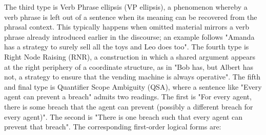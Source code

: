 The third type is Verb Phrase ellipsis (VP ellipsis), a phenomenon whereby a verb phrase is left out of a sentence when its meaning can be recovered from the phrasal context. This typically happens when omitted material mirrors a verb phrase already introduced earlier in the discourse; an example follows "Amanda has a strategy to surely sell all the toys and Leo does too". The fourth type is Right Node Raising (RNR), a construction in which a shared argument appears at the right periphery of a coordinate structure, as in "Bob has, but Albert has not, a strategy to ensure that the vending machine is always operative". The fifth and final type is Quantifier Scope Ambiguity (QSA), where a sentence like "Every agent can prevent a breach" admits two readings. The first is "For every agent, there is some breach that the agent can prevent (possibly a different breach for every agent)". The second is "There is one breach such that every agent can prevent that breach". The corresponding first-order logical forms are:
